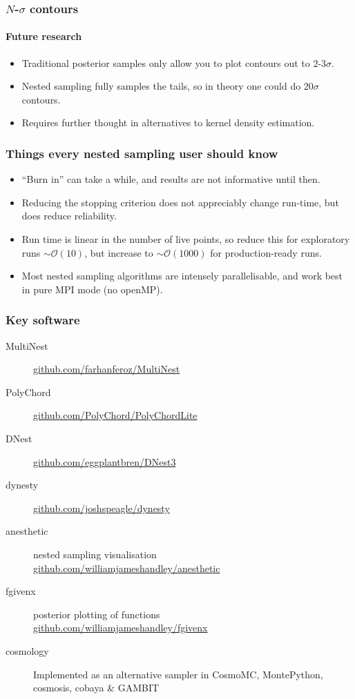 \documentclass[%
]{beamer}
\begin{document}
\begin{frame}
    \frametitle{$N$-$\sigma$ contours}
    \framesubtitle{Future research}
    \begin{itemize}
        \item Traditional posterior samples only allow you to plot contours out to 2-3$\sigma$.
        \item Nested sampling fully samples the tails, so in theory one could do $20\sigma$ contours.
        \item Requires further thought in alternatives to kernel density estimation.
    \end{itemize}
\end{frame}

\begin{frame}
    \frametitle{Things every nested sampling user should know}
        \begin{itemize}
            \item ``Burn in'' can take a while, and results are not informative until then.
            \item Reducing the stopping criterion does not appreciably change run-time, but does reduce reliability.
            \item Run time is linear in the number of live points, so reduce this for exploratory runs $\sim\mathcal{O}(10)$, but increase to $\sim\mathcal{O}(1000)$ for production-ready runs.
            \item Most nested sampling algorithms are intensely parallelisable, and work best in pure MPI mode (no openMP).
        \end{itemize}
\end{frame}


\begin{frame}
    \frametitle{Key software}
    \begin{description}
        \item[MultiNest] \url{github.com/farhanferoz/MultiNest}
        \item[PolyChord] \url{github.com/PolyChord/PolyChordLite}
        \item[DNest] \url{github.com/eggplantbren/DNest3}
        \item[dynesty] \url{github.com/joshspeagle/dynesty}
        \item[anesthetic] nested sampling visualisation \\ \url{github.com/williamjameshandley/anesthetic}
        \item[fgivenx] posterior plotting of functions \\ \url{github.com/williamjameshandley/fgivenx}
        \item[cosmology] Implemented as an alternative sampler in CosmoMC, MontePython, cosmosis, cobaya \& GAMBIT
    \end{description}
\end{frame}
\end{document}
